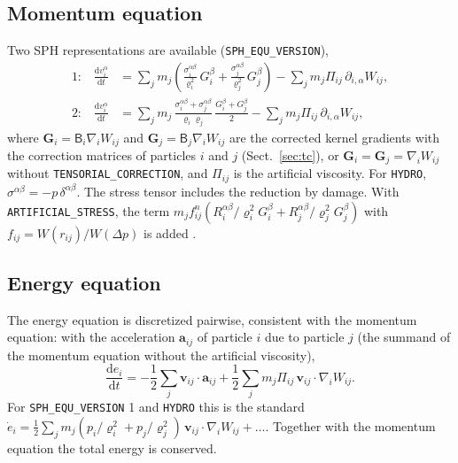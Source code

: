 \documentclass[10pt,fleqn,twoside]{article}
\renewcommand{\vec}[1]{{\mathbf #1}}
\newcommand{\sw}[1]{\texttt{#1}}
\newcommand{\dd}{\mathrm{d}}
\newcommand{\gradW}{\nabla_{\!i} W_{ij}}
\begin{document}
\subsection{Momentum equation}
\label{sec:momentum}
Two SPH representations are available (\sw{SPH\_EQU\_VERSION}),
\begin{align}
 \text{1:}\quad \frac{\dd v_i^\alpha}{\dd t} &= \sum_j m_j\left(\frac{\sigma_i^{\alpha\beta}}{\varrho_i^2}\,G_{i}^\beta
   + \frac{\sigma_j^{\alpha\beta}}{\varrho_j^2}\,G_{j}^\beta\right) - \sum_j m_j\Pi_{ij}\,\partial_{i,\alpha}W_{ij},\\
 \text{2:}\quad \frac{\dd v_i^\alpha}{\dd t} &= \sum_j m_j\,\frac{\sigma_i^{\alpha\beta} + \sigma_j^{\alpha\beta}}{\varrho_i\varrho_j}\,
   \frac{G_{i}^\beta + G_{j}^\beta}{2} - \sum_j m_j\Pi_{ij}\,\partial_{i,\alpha}W_{ij},
\end{align}
where $\vec G_{i} = \mathsf B_i\gradW$ and $\vec G_{j} = \mathsf B_j\gradW$ are the corrected kernel gradients with the
correction matrices of particles $i$ and $j$ (Sect.~\ref{sec:tc}), or $\vec G_{i} = \vec G_{j} = \gradW$ without
\sw{TENSORIAL\_CORRECTION}, and $\Pi_{ij}$ is the artificial viscosity. For \sw{HYDRO}, $\sigma^{\alpha\beta} =
-p\,\delta^{\alpha\beta}$. The stress tensor includes the reduction by damage. With \sw{ARTIFICIAL\_STRESS}, the term
$m_j f_{ij}^n (R_i^{\alpha\beta}/\varrho_i^2 G_i^\beta + R_j^{\alpha\beta}/\varrho_j^2 G_j^\beta)$ with
$f_{ij} = W(r_{ij})/W(\Delta p)$ is added \citep{monaghan:2000,gray:2001}.

\subsection{Energy equation}
The energy equation is discretized pairwise, consistent with the momentum equation: with the acceleration
$\vec a_{ij}$ of particle $i$ due to particle $j$ (the summand of the momentum equation without the artificial
viscosity),
\begin{equation}
 \frac{\dd e_i}{\dd t} = -\frac{1}{2}\sum_j \vec v_{ij}\cdot\vec a_{ij}
   + \frac{1}{2}\sum_j m_j\Pi_{ij}\,\vec v_{ij}\cdot\gradW.
\end{equation}
For \sw{SPH\_EQU\_VERSION} 1 and \sw{HYDRO} this is the standard
$\dot e_i = \frac{1}{2}\sum_j m_j (p_i/\varrho_i^2 + p_j/\varrho_j^2)\,\vec v_{ij}\cdot\gradW + \ldots$. Together with
the momentum equation the total energy is conserved.
\end{document}
